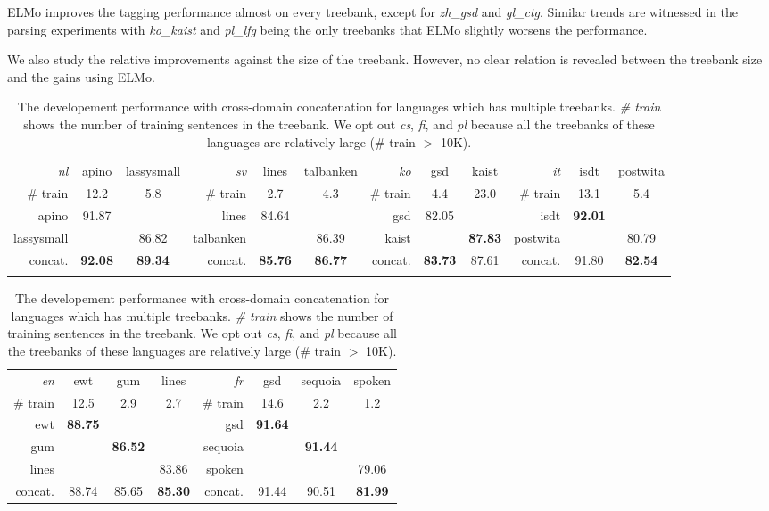 \documentclass[11pt,a4paper]{article}
\begin{document}
ELMo improves the tagging performance almost on every treebank,
except for \textit{zh\_gsd} and \textit{gl\_ctg}.
Similar trends are witnessed in the parsing experiments with \textit{ko\_kaist}
and \textit{pl\_lfg} being the only treebanks that ELMo slightly worsens the performance.

We also study the relative improvements against the size of the treebank.
However, no clear relation is revealed between the treebank size and the gains using ELMo.
\begin{table}[t]
	\centering
	\small
	\setlength{\tabcolsep}{5pt}
	\begin{tabular}{rcc || rcc || rcc || rcc}
		\textit{nl} & apino & lassysmall & \textit{sv} & lines & talbanken & \textit{ko} & gsd & kaist & \textit{it} & isdt & postwita \\
		\# train & 12.2 & 5.8 & \# train & 2.7 & 4.3 & \# train & 4.4 & 23.0 & \# train & 13.1 & 5.4 \\
		\hline
		apino & 91.87 & & lines & 84.64 & & gsd & 82.05 & & isdt & \textbf{92.01} & \\
		lassysmall & & 86.82 & talbanken & & 86.39 & kaist & & \textbf{87.83} & postwita & & 80.79 \\
		\hline
		concat. & \textbf{92.08} & \textbf{89.34} & concat. & \textbf{85.76} & \textbf{86.77} & concat. & \textbf{83.73} & 87.61 & concat.& 91.80 & \textbf{82.54} \\
		\vspace*{0.5em}
	\end{tabular}
	\begin{tabular}{rccc || rccc}
		\textit{en} & ewt & gum & lines & \textit{fr} & gsd & sequoia & spoken \\
		\# train & 12.5 & 2.9 & 2.7 & \# train & 14.6 & 2.2 & 1.2\\
		\hline
		ewt & \textbf{88.75} & & & gsd & \textbf{91.64} & & \\
		gum & & \textbf{86.52} & & sequoia & & \textbf{91.44} & \\
		lines & & & 83.86 & spoken & & & 79.06 \\
		\hline
		concat. & 88.74 & 85.65 & \textbf{85.30} & concat. & 91.44 & 90.51 & \textbf{81.99} \\
	\end{tabular}
	\caption{The developement performance with cross-domain concatenation for languages which has multiple treebanks.
		\textit{\# train} shows the number of training sentences in the treebank.
		We opt out \textit{cs}, \textit{fi}, and \textit{pl} because all the treebanks of these languages are relatively large (\# train $>$ 10K).}\label{tbl:confuse-mat}
\end{table}
\end{document}
